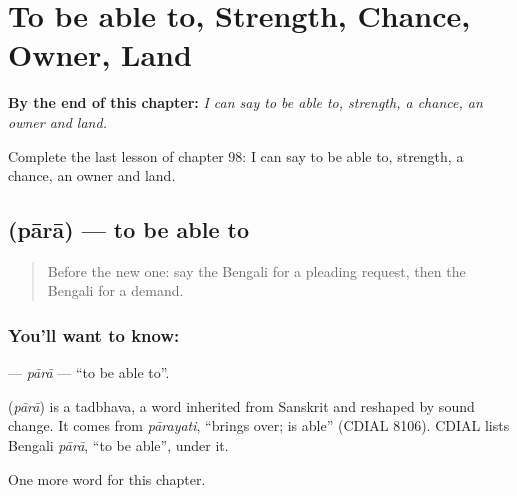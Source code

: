 
\chapter{To be able to, Strength, Chance, Owner, Land}
\label{ch:bn-to-be-able-to-strength-chance-owner-land}

\begin{chapteropening}
\textbf{By the end of this chapter:} \emph{I can say to be able to, strength, a chance, an owner and land.}

Complete the last lesson of chapter 98: I can say to be able to, strength, a chance, an owner and land.
\end{chapteropening}

\section[\texorpdfstring{\bn{পারা} (pārā)}{পারা (pārā)}]{ (pārā) — to be able to}

\label{lesson:BN-C98-para}



\begin{quote}
Before the new one: say the Bengali for a pleading request, then the Bengali for a demand.
\end{quote}

\subsection*{You'll want to know: }
\textbf{} — \emph{pārā} — \textquotedblleft{}to be able to\textquotedblright{}.

\begin{cousinweb}
\textbf{} (\emph{pārā}) is a tadbhava, a word inherited from Sanskrit and reshaped by sound change. It comes from \emph{pārayati}, \textquotedblleft{}brings over; is able\textquotedblright{} (CDIAL 8106). CDIAL lists Bengali \emph{pārā}, \textquotedblleft{}to be able\textquotedblright{}, under it.
\end{cousinweb}

\begin{grammarlens}[title={What you've built}]
One more word for this chapter.
\end{grammarlens}

